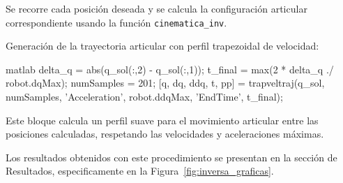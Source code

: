 Se recorre cada posición deseada y se calcula la configuración articular correspondiente usando la función \texttt{cinematica\_inv}.

\bigskip

Generación de la trayectoria articular con perfil trapezoidal de velocidad:

\begin{matlabcode}{matlab}
	delta_q = abs(q_sol(:,2) - q_sol(:,1));
	t_final = max(2 * delta_q ./ robot.dqMax);
	numSamples = 201;
	[q, dq, ddq, t, pp] = trapveltraj(q_sol, numSamples, 'Acceleration', robot.ddqMax, 'EndTime', t_final);
\end{matlabcode}

Este bloque calcula un perfil suave para el movimiento articular entre las posiciones calculadas, respetando las velocidades y aceleraciones máximas.

\bigskip

Los resultados obtenidos con este procedimiento se presentan en la sección de Resultados, especificamente en la Figura~\ref{fig:inversa_graficas}.